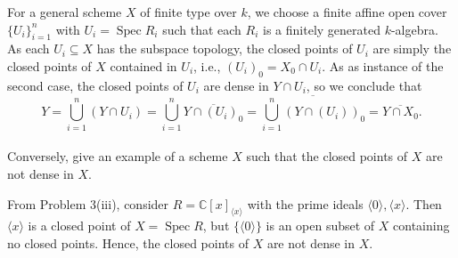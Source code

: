 \documentclass[12pt]{article}
\newlength{\myparskip}
\newenvironment{fullbox}{\begin{lrbox}{\savefullbox}\begin{minipage}{\dimexpr\textwidth-2\fboxsep\relax}\setlength{\parskip}{\myparskip}}{\end{minipage}\end{lrbox}\framebox[\textwidth]{\usebox{\savefullbox}}}
\newenvironment{pbox}[1][]{\begin{fullbox}\ifx#1\empty\else\paragraph{#1}\phantom{}\fi}{\end{fullbox}}
\theoremstyle{definition}
\newcommand{\C}{\mathbb{C}}
\newcommand{\<}{\langle}
\renewcommand{\>}{\rangle}
\newcommand{\clo}{\overline}
\DeclareMathOperator{\Spec}{Spec}
\begin{document}
For a general scheme $X$ of finite type over $k$, we choose a finite affine open cover $\{U_i\}_{i=1}^{n}$ with $U_i = \Spec R_i$ such that each $R_i$ is a finitely generated $k$-algebra.
As each $U_i \subseteq X$ has the subspace topology, the closed points of $U_i$ are simply the closed points of $X$ contained in $U_i$, i.e., $(U_i)_0 = X_0 \cap U_i$.
As as instance of the second case, the closed points of $U_i$ are dense in $Y \cap U_i$, so we conclude that
\[
    Y
        = \bigcup_{i=1}^{n} (Y \cap U_i)
        = \bigcup_{i=1}^{n} \clo{Y \cap (U_i)_0}
        = \clo{\textstyle\bigcup_{i=1}^{n} (Y \cap (U_i))_0}
        = \clo{Y \cap X_0}.
\]



\begin{pbox}
    Conversely, give an example of a scheme $X$ such that the closed points of $X$ are not dense in $X$.
\end{pbox}

From Problem 3(iii), consider $R = \C[x]_{\<x\>}$ with the prime ideals $\<0\>, \<x\>$.
Then $\<x\>$ is a closed point of $X = \Spec R$, but $\{\<0\>\}$ is an open subset of $X$ containing no closed points.
Hence, the closed points of $X$ are not dense in $X$.
\end{document}
